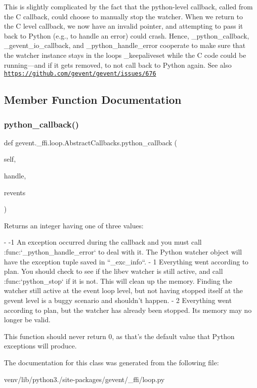 This is slightly complicated by the fact that the python-\/level callback, called from the C callback, could choose to manually stop the watcher. When we return to the C level callback, we now have an invalid pointer, and attempting to pass it back to Python (e.\+g., to handle an error) could crash. Hence, \+\_\+python\+\_\+callback, \+\_\+gevent\+\_\+io\+\_\+callback, and \+\_\+python\+\_\+handle\+\_\+error cooperate to make sure that the watcher instance stays in the loops {\ttfamily \+\_\+keepaliveset} while the C code could be running---and if it gets removed, to not call back to Python again. See also \href{https://github.com/gevent/gevent/issues/676}{\tt https\+://github.\+com/gevent/gevent/issues/676} 

\subsection{Member Function Documentation}
\mbox{\label{classgevent_1_1__ffi_1_1loop_1_1_abstract_callbacks_a48b9030fe4b0002fbb3374bbe85b30c3}} 
\subsubsection{\texorpdfstring{python\+\_\+callback()}{python\_callback()}}
{\footnotesize\ttfamily def gevent.\+\_\+ffi.\+loop.\+Abstract\+Callbacks.\+python\+\_\+callback (\begin{DoxyParamCaption}\item[{}]{self,  }\item[{}]{handle,  }\item[{}]{revents }\end{DoxyParamCaption})}

\begin{DoxyVerb}Returns an integer having one of three values:

- -1
  An exception occurred during the callback and you must call
  :func:`_python_handle_error` to deal with it. The Python watcher
  object will have the exception tuple saved in ``_exc_info``.
- 1
  Everything went according to plan. You should check to see if the libev
  watcher is still active, and call :func:`python_stop` if it is not. This will
  clean up the memory. Finding the watcher still active at the event loop level,
  but not having stopped itself at the gevent level is a buggy scenario and
  shouldn't happen.
- 2
  Everything went according to plan, but the watcher has already
  been stopped. Its memory may no longer be valid.

This function should never return 0, as that's the default value that
Python exceptions will produce.
\end{DoxyVerb}
 

The documentation for this class was generated from the following file\+:\begin{DoxyCompactItemize}
\item 
venv/lib/python3./site-\/packages/gevent/\+\_\+ffi/loop.\+py\end{DoxyCompactItemize}
